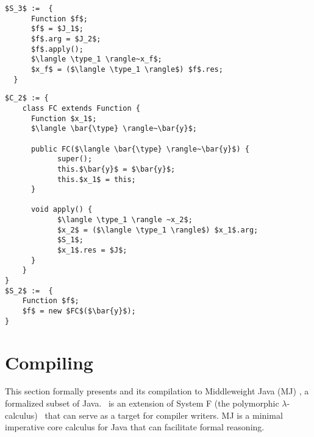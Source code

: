 \HaskellReset

\makeatother
\EndFmtInput
\newcommand{\typeSrc}{T}
\newcommand{\envSrc}{G}

\newsavebox{\normalapply}
\newsavebox{\normalclosure}

\begin{lrbox}{\normalapply}
\begin{minipage}{2in} %
\begin{lstlisting}[mathescape]
  $S_3$ :=  {
	  Function $f$;
	  $f$ = $J_1$;
	  $f$.arg = $J_2$;
	  $f$.apply();
	  $\langle \type_1 \rangle~x_f$;
	  $x_f$ = ($\langle \type_1 \rangle$) $f$.res;
  }
\end{lstlisting}
\end{minipage}
\end{lrbox}

\begin{lrbox}{\normalclosure}
\begin{minipage}{3in}
\hspace{50pt}\begin{lstlisting}[mathescape]
$C_2$ := {
	class FC extends Function {
	  Function $x_1$;
	  $\langle \bar{\type} \rangle~\bar{y}$;

	  public FC($\langle \bar{\type} \rangle~\bar{y}$) {
			super();
			this.$\bar{y}$ = $\bar{y}$;
			this.$x_1$ = this;
	  }

	  void apply() {
			$\langle \type_1 \rangle ~x_2$;
			$x_2$ = ($\langle \type_1 \rangle$) $x_1$.arg;
			$S_1$;
			$x_1$.res = $J$;
	  }
	}
}
$S_2$ :=  {
	Function $f$;
	$f$ = new $FC$($\bar{y}$);
}
\end{lstlisting}
\end{minipage}
\end{lrbox}

\section{Compiling \Name}\label{sec:fcore}

This section formally presents \name and its compilation to Middleweight Java (MJ) 
\cite{bierman03imperative}, a formalized subset of Java. \Name~is an extension of System F (the polymorphic
$\lambda$-calculus)~\cite{girard72dissertation,reynolds74towards} that
can serve as a target for compiler writers. MJ is
a minimal imperative core calculus for Java that can facilitate formal reasoning.

